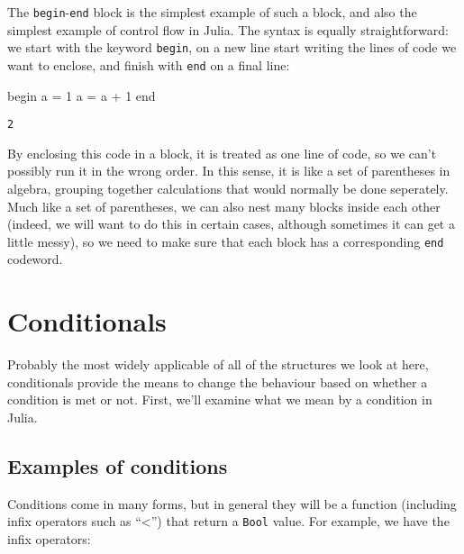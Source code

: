 \documentclass[
  letterpaper,
  DIV=11,
  numbers=noendperiod]{scrreprt}
\newenvironment{Shaded}{\begin{snugshade}}{\end{snugshade}}
\newcommand{\ControlFlowTok}[1]{\textcolor[rgb]{0.00,0.23,0.31}{#1}}
\newcommand{\FloatTok}[1]{\textcolor[rgb]{0.68,0.00,0.00}{#1}}
\newcommand{\NormalTok}[1]{\textcolor[rgb]{0.00,0.23,0.31}{#1}}
\newcommand{\OperatorTok}[1]{\textcolor[rgb]{0.37,0.37,0.37}{#1}}
\begin{document}
The \texttt{begin}-\texttt{end} block is the simplest example of such a
block, and also the simplest example of control flow in Julia. The
syntax is equally straightforward: we start with the keyword
\texttt{begin}, on a new line start writing the lines of code we want to
enclose, and finish with \texttt{end} on a final line:

\begin{Shaded}
\begin{Highlighting}[]
\ControlFlowTok{begin}
\NormalTok{    a }\OperatorTok{=} \FloatTok{1}
\NormalTok{    a }\OperatorTok{=}\NormalTok{ a }\OperatorTok{+} \FloatTok{1}
\ControlFlowTok{end}
\end{Highlighting}
\end{Shaded}

\begin{verbatim}
2
\end{verbatim}

By enclosing this code in a block, it is treated as one line of code, so
we can't possibly run it in the wrong order. In this sense, it is like a
set of parentheses in algebra, grouping together calculations that would
normally be done seperately. Much like a set of parentheses, we can also
nest many blocks inside each other (indeed, we will want to do this in
certain cases, although sometimes it can get a little messy), so we need
to make sure that each block has a corresponding \texttt{end} codeword.

\hypertarget{conditionals}{%
\section{Conditionals}\label{conditionals}}

Probably the most widely applicable of all of the structures we look at
here, conditionals provide the means to change the behaviour based on
whether a condition is met or not. First, we'll examine what we mean by
a condition in Julia.

\hypertarget{examples-of-conditions}{%
\subsection{Examples of conditions}\label{examples-of-conditions}}

Conditions come in many forms, but in general they will be a function
(including infix operators such as ``\textless{}'') that return a
\texttt{Bool} value. For example, we have the infix operators:
\end{document}
